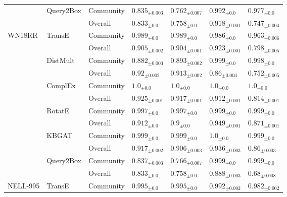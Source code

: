\begin{table}[hb!]
\begin{adjustbox}{width=\textwidth}
\begin{tabular}{lllllll}
         & Query2Box & Community &  ${{0.835}_{\pm 0.003}}$ &  ${{0.762}_{\pm 0.007}}$ &    ${{0.992}_{\pm 0.0}}$ &    ${{0.977}_{\pm 0.0}}$ \\
         &           & Overall &    ${{0.833}_{\pm 0.0}}$ &    ${{0.758}_{\pm 0.0}}$ &  ${{0.918}_{\pm 0.001}}$ &  ${{0.747}_{\pm 0.004}}$ \\
\midrule
WN18RR & TransE & Community &    ${{0.989}_{\pm 0.0}}$ &    ${{0.989}_{\pm 0.0}}$ &    ${{0.986}_{\pm 0.0}}$ &  ${{0.963}_{\pm 0.006}}$ \\
         &           & Overall &  ${{0.905}_{\pm 0.002}}$ &  ${{0.904}_{\pm 0.001}}$ &  ${{0.923}_{\pm 0.001}}$ &  ${{0.798}_{\pm 0.005}}$ \\
         & DistMult & Community &  ${{0.882}_{\pm 0.003}}$ &  ${{0.893}_{\pm 0.002}}$ &    ${{0.999}_{\pm 0.0}}$ &    ${{0.998}_{\pm 0.0}}$ \\
         &           & Overall &   ${{0.92}_{\pm 0.002}}$ &  ${{0.913}_{\pm 0.002}}$ &   ${{0.86}_{\pm 0.003}}$ &  ${{0.752}_{\pm 0.005}}$ \\
         & ComplEx & Community &      ${{1.0}_{\pm 0.0}}$ &      ${{1.0}_{\pm 0.0}}$ &      ${{1.0}_{\pm 0.0}}$ &      ${{1.0}_{\pm 0.0}}$ \\
         &           & Overall &  ${{0.925}_{\pm 0.001}}$ &  ${{0.917}_{\pm 0.001}}$ &  ${{0.912}_{\pm 0.001}}$ &  ${{0.814}_{\pm 0.001}}$ \\
         & RotatE & Community &    ${{0.997}_{\pm 0.0}}$ &    ${{0.997}_{\pm 0.0}}$ &    ${{0.999}_{\pm 0.0}}$ &    ${{0.999}_{\pm 0.0}}$ \\
         &           & Overall &    ${{0.912}_{\pm 0.0}}$ &      ${{0.9}_{\pm 0.0}}$ &  ${{0.949}_{\pm 0.001}}$ &  ${{0.871}_{\pm 0.001}}$ \\
         & KBGAT & Community &    ${{0.999}_{\pm 0.0}}$ &    ${{0.999}_{\pm 0.0}}$ &      ${{1.0}_{\pm 0.0}}$ &    ${{0.999}_{\pm 0.0}}$ \\
         &           & Overall &  ${{0.917}_{\pm 0.002}}$ &  ${{0.906}_{\pm 0.003}}$ &  ${{0.936}_{\pm 0.003}}$ &   ${{0.86}_{\pm 0.003}}$ \\
         & Query2Box & Community &  ${{0.837}_{\pm 0.003}}$ &  ${{0.766}_{\pm 0.007}}$ &    ${{0.999}_{\pm 0.0}}$ &    ${{0.999}_{\pm 0.0}}$ \\
         &           & Overall &    ${{0.833}_{\pm 0.0}}$ &    ${{0.758}_{\pm 0.0}}$ &  ${{0.888}_{\pm 0.003}}$ &   ${{0.68}_{\pm 0.008}}$ \\
\midrule
NELL-995 & TransE & Community &    ${{0.995}_{\pm 0.0}}$ &    ${{0.995}_{\pm 0.0}}$ &  ${{0.992}_{\pm 0.002}}$ &  ${{0.982}_{\pm 0.002}}$ \\

\end{tabular}
\end{adjustbox}
\end{table}
